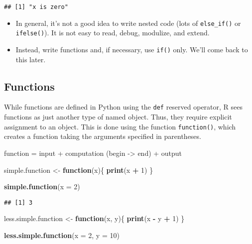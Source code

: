 \documentclass[
]{book}
\newenvironment{Shaded}{\begin{snugshade}}{\end{snugshade}}
\newcommand{\ControlFlowTok}[1]{\textcolor[rgb]{0.13,0.29,0.53}{\textbf{#1}}}
\newcommand{\DataTypeTok}[1]{\textcolor[rgb]{0.13,0.29,0.53}{#1}}
\newcommand{\DecValTok}[1]{\textcolor[rgb]{0.00,0.00,0.81}{#1}}
\newcommand{\KeywordTok}[1]{\textcolor[rgb]{0.13,0.29,0.53}{\textbf{#1}}}
\newcommand{\NormalTok}[1]{#1}
\newcommand{\OperatorTok}[1]{\textcolor[rgb]{0.81,0.36,0.00}{\textbf{#1}}}
\newcommand{\StringTok}[1]{\textcolor[rgb]{0.31,0.60,0.02}{#1}}
\providecommand{\tightlist}{%
  \setlength{\itemsep}{0pt}\setlength{\parskip}{0pt}}
\begin{document}
\begin{verbatim}
## [1] "x is zero"
\end{verbatim}

\begin{itemize}
\tightlist
\item
  In general, it's not a good idea to write nested code (lots of \texttt{else\_if()} or \texttt{ifelse()}). It is not easy to read, debug, modulize, and extend.
\item
  Instead, write functions and, if necessary, use \texttt{if()} only. We'll come back to this later.
\end{itemize}

\hypertarget{functions}{%
\subsection{Functions}\label{functions}}

While functions are defined in Python using the \texttt{def} reserved operator, R sees functions as just another type of named object. Thus, they require explicit assignment to an object. This is done using the function \texttt{function()}, which creates a function taking the arguments specified in parentheses.

function = input + computation (begin -\textgreater{} end) + output

\begin{Shaded}
\begin{Highlighting}[]
\NormalTok{simple.function \textless{}{-}}\StringTok{ }\ControlFlowTok{function}\NormalTok{(x)\{}
  \KeywordTok{print}\NormalTok{(x }\OperatorTok{+}\StringTok{ }\DecValTok{1}\NormalTok{)}
\NormalTok{\}}

\KeywordTok{simple.function}\NormalTok{(}\DataTypeTok{x =} \DecValTok{2}\NormalTok{)}
\end{Highlighting}
\end{Shaded}

\begin{verbatim}
## [1] 3
\end{verbatim}

\begin{Shaded}
\begin{Highlighting}[]
\NormalTok{less.simple.function \textless{}{-}}\StringTok{ }\ControlFlowTok{function}\NormalTok{(x, y)\{}
  \KeywordTok{print}\NormalTok{(x }\OperatorTok{{-}}\StringTok{ }\NormalTok{y }\OperatorTok{+}\StringTok{ }\DecValTok{1}\NormalTok{)}
\NormalTok{\}}

\KeywordTok{less.simple.function}\NormalTok{(}\DataTypeTok{x =} \DecValTok{2}\NormalTok{, }\DataTypeTok{y =} \DecValTok{10}\NormalTok{)}
\end{Highlighting}
\end{Shaded}
\end{document}
